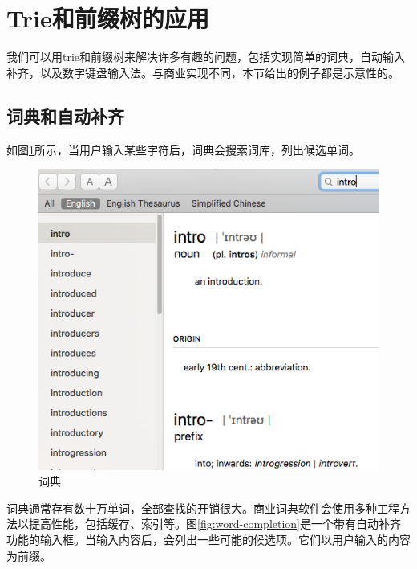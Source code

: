\documentclass[b5paper]{ctexart}
\begin{document}
\begin{Exercise}
\end{Exercise}

\section{Trie和前缀树的应用}

我们可以用trie和前缀树来解决许多有趣的问题，包括实现简单的词典，自动输入补齐，以及数字键盘输入法。与商业实现不同，本节给出的例子都是示意性的。

\subsection{词典和自动补齐}

如图\ref{fig:e-dict}所示，当用户输入某些字符后，词典会搜索词库，列出候选单词。

\begin{figure}[htbp]
  \centering
  \includegraphics[scale=0.5]{img/edict-en}
  \caption{词典}
  \label{fig:e-dict}
\end{figure}

词典通常存有数十万单词，全部查找的开销很大。商业词典软件会使用多种工程方法以提高性能，包括缓存、索引等。图\ref{fig:word-completion}是一个带有自动补齐功能的输入框。当输入内容后，会列出一些可能的候选项。它们以用户输入的内容为前缀。
\end{document}
